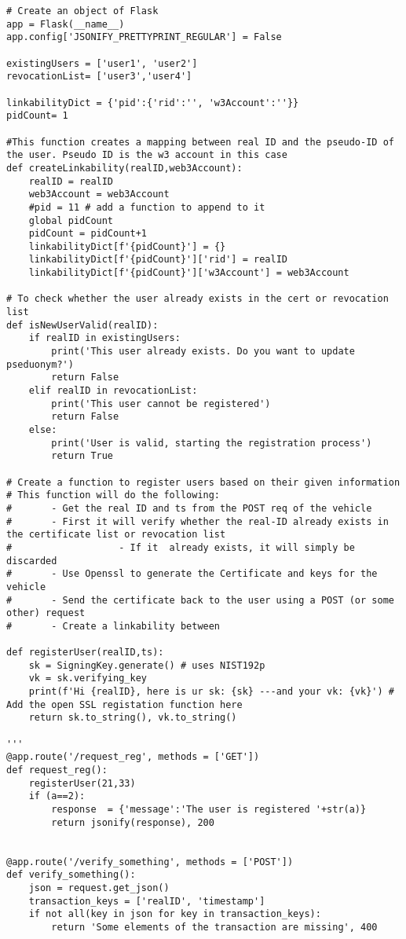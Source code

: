 \begin{linenumbers}
\begin{lstlisting}
# Create an object of Flask 
app = Flask(__name__)
app.config['JSONIFY_PRETTYPRINT_REGULAR'] = False

existingUsers = ['user1', 'user2']
revocationList= ['user3','user4']

linkabilityDict = {'pid':{'rid':'', 'w3Account':''}}
pidCount= 1

#This function creates a mapping between real ID and the pseudo-ID of the user. Pseudo ID is the w3 account in this case
def createLinkability(realID,web3Account):
    realID = realID
    web3Account = web3Account
    #pid = 11 # add a function to append to it
    global pidCount
    pidCount = pidCount+1
    linkabilityDict[f'{pidCount}'] = {}
    linkabilityDict[f'{pidCount}']['rid'] = realID
    linkabilityDict[f'{pidCount}']['w3Account'] = web3Account

# To check whether the user already exists in the cert or revocation list
def isNewUserValid(realID):
    if realID in existingUsers:
        print('This user already exists. Do you want to update pseduonym?')
        return False
    elif realID in revocationList:
        print('This user cannot be registered')
        return False
    else:
        print('User is valid, starting the registration process')
        return True

# Create a function to register users based on their given information
# This function will do the following:
#       - Get the real ID and ts from the POST req of the vehicle
#       - First it will verify whether the real-ID already exists in the certificate list or revocation list
#                   - If it  already exists, it will simply be discarded
#       - Use Openssl to generate the Certificate and keys for the vehicle
#       - Send the certificate back to the user using a POST (or some other) request
#       - Create a linkability between 

def registerUser(realID,ts):
    sk = SigningKey.generate() # uses NIST192p
    vk = sk.verifying_key
    print(f'Hi {realID}, here is ur sk: {sk} ---and your vk: {vk}') # Add the open SSL registation function here
    return sk.to_string(), vk.to_string()

'''
@app.route('/request_reg', methods = ['GET'])
def request_reg():
    registerUser(21,33)
    if (a==2):
        response  = {'message':'The user is registered '+str(a)}
        return jsonify(response), 200


@app.route('/verify_something', methods = ['POST'])
def verify_something():
    json = request.get_json()
    transaction_keys = ['realID', 'timestamp']
    if not all(key in json for key in transaction_keys):
        return 'Some elements of the transaction are missing', 400


\end{lstlisting}
\end{linenumbers}
